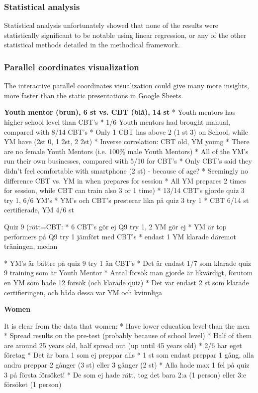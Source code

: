 \subsubsection{Statistical analysis}
Statistical analysis unfortunately showed that none of the results were statistically significant to be notable using linear regression, or any of the other statistical methods detailed in the methodical framework.

\subsubsection{Parallel coordinates visualization}
The interactive parallel coordinates visualization could give many more insights, more faster than the static presentations in Google Sheets.

\textbf{Youth mentor (brun), 6 st vs. CBT (blå), 14 st}
* Youth mentors has higher school level than CBT's
* 1/6 Youth mentors had brought manual, compared with 8/14 CBT's
* Only 1 CBT has above 2 (1 st 3) on School, while YM have (2st 0, 1 2st, 2 2st)
* Inverse correlation: CBT old, YM young
* There are no female Youth Mentors (i.e. 100\% male Youth Mentors)
* All of the YM's run their own businesses, compared with 5/10 for CBT's
* Only CBT's said they didn't feel comfortable with smartphone (2 st) - because of age?
* Seemingly no difference CBT vs. YM in when prepares for session
* All YM prepares 2 times for session, while CBT can train also 3 or 1 time)
* 13/14 CBT's gjorde quiz 3 try 1, 6/6 YM's
* YM's och CBT's presterar lika på quiz 3 try 1
* CBT 6/14 st certifierade, YM 4/6 st

Quiz 9 (rött=CBT:
* 6 CBT's gör ej Q9 try 1, 2 YM gör ej
* YM är top performers på Q9 try 1 jämfört med CBT's
* endast 1 YM klarade däremot träningen, medan

* YM's är bättre på quiz 9 try 1 än CBT's
* Det är endast 1/7 som klarade quiz 9 training som är Youth Mentor
* Antal försök man gjorde är likvärdigt, förutom en YM som hade 12 försök (och klarade quiz)
* Det var endast 2 st som klarade certifieringen, och båda dessa var YM och kvinnliga

\textbf{Women}

It is clear from the data that women:
* Have lower education level than the men
* Spread results on the pre-test (probably because of school level)
* Half of them are around 25 years old, half spread out (up until 45 years old)
* 2/6 har eget företag
* Det är bara 1 som ej preppar alls
* 1 st som endast preppar 1 gång, alla andra preppar 2 gånger (3 st) eller 3 gånger (2 st)
* Alla hade max 1 fel på quiz 3 på första försöket!
* De som ej hade rätt, tog det bara 2:a (1 person) eller 3:e försöket (1 person)

